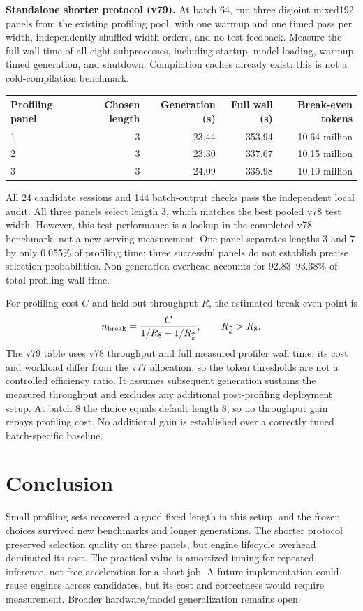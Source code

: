 \documentclass[10pt]{article}
\begin{document}
\textbf{Standalone shorter protocol (v79).} At batch 64, run three disjoint mixed192 panels from the existing profiling pool, with one warmup and one timed pass per width, independently shuffled width orders, and no test feedback. Measure the full wall time of all eight subprocesses, including startup, model loading, warmup, timed generation, and shutdown. Compilation caches already exist: this is not a cold-compilation benchmark.

\begin{center}\small
\begin{tabular}{@{}lrrrr@{}}\toprule
Profiling panel & Chosen length & Generation (s) & Full wall (s) & Break-even tokens \\\midrule
1 & 3 & 23.44 & 353.94 & 10.64 million \\
2 & 3 & 23.30 & 337.67 & 10.15 million \\
3 & 3 & 24.09 & 335.98 & 10.10 million \\\bottomrule
\end{tabular}
\end{center}

All 24 candidate sessions and 144 batch-output checks pass the independent local audit. All three panels select length 3, which matches the best pooled v78 test width. However, this test performance is a lookup in the completed v78 benchmark, not a new serving measurement. One panel separates lengths 3 and 7 by only 0.055\% of profiling time; three successful panels do not establish precise selection probabilities. Non-generation overhead accounts for 92.83--93.38\% of total profiling wall time.

For profiling cost $C$ and held-out throughput $R$, the estimated break-even point is
\[
 n_{\rm break}=\frac{C}{1/R_{8}-1/R_{\widehat k}},\qquad R_{\widehat k}>R_8.
\]
The v79 table uses v78 throughput and full measured profiler wall time; its cost and workload differ from the v77 allocation, so the token thresholds are not a controlled efficiency ratio. It assumes subsequent generation sustains the measured throughput and excludes any additional post-profiling deployment setup. At batch 8 the choice equals default length 8, so no throughput gain repays profiling cost. No additional gain is established over a correctly tuned batch-specific baseline.

\section{Conclusion}
Small profiling sets recovered a good fixed length in this setup, and the frozen choices survived new benchmarks and longer generations. The shorter protocol preserved selection quality on three panels, but engine lifecycle overhead dominated its cost. The practical value is amortized tuning for repeated inference, not free acceleration for a short job. A future implementation could reuse engines across candidates, but its cost and correctness would require measurement. Broader hardware/model generalization remains open.
\end{document}
